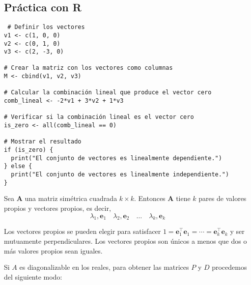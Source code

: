 \subsection{Práctica con R}
\begin{verbatim}
 # Definir los vectores
v1 <- c(1, 0, 0)
v2 <- c(0, 1, 0)
v3 <- c(2, -3, 0)

# Crear la matriz con los vectores como columnas
M <- cbind(v1, v2, v3)

# Calcular la combinación lineal que produce el vector cero
comb_lineal <- -2*v1 + 3*v2 + 1*v3

# Verificar si la combinación lineal es el vector cero
is_zero <- all(comb_lineal == 0)

# Mostrar el resultado
if (is_zero) {
  print("El conjunto de vectores es linealmente dependiente.")
} else {
  print("El conjunto de vectores es linealmente independiente.")
}   
\end{verbatim}
\begin{definition}
Sea $\mathbf{A}$ una matriz simétrica cuadrada $k \times k$. Entonces $\mathbf{A}$ tiene $k$ pares de valores propios y vectores propios, es decir,
$$
\lambda_1, \mathbf{e}_1 \quad \lambda_2, \mathbf{e}_2 \quad \ldots \quad \lambda_k, \mathbf{e}_k
$$

Los vectores propios se pueden elegir para satisfacer $1=\mathbf{e}_1^{\top} \mathbf{e}_1=\cdots=\mathbf{e}_k^{\top} \mathbf{e}_k$ y ser mutuamente perpendiculares. Los vectores propios son únicos a menos que dos o más valores propios sean iguales.    
\end{definition}
Si $A$ es diagonalizable en los reales, para obtener las matrices $P$ y $D$ procedemos del siguiente modo:

